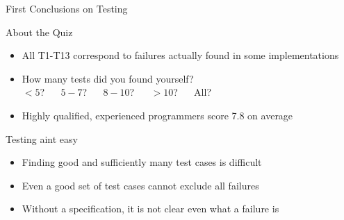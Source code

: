 \begin{frame}{First Conclusions on Testing}
  \begin{block}{About the Quiz}
    \begin{itemize}
    \item All T1-T13 correspond to failures actually found in some implementations
    \item How many tests did you found yourself?\\
      $<5$? ~~ $5-7$? ~~ $8-10$? ~~ $>10$? ~~ All?
    \item Highly qualified, experienced programmers score \alert{7.8} on average
    \end{itemize}
  \end{block}
  \begin{block}{Testing aint easy}
    \begin{itemize}
    \item Finding good and sufficiently many test cases is difficult
    \item Even a good set of test cases cannot exclude \alert{all} failures
    \item Without a specification, it is not clear even what a failure
      \alert{is} 
    \end{itemize}
  \end{block}
\end{frame}
